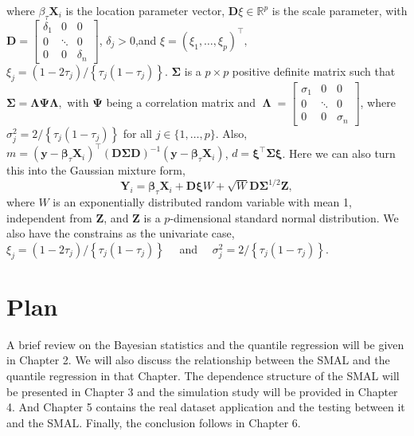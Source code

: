 \documentclass[mstat,12pt]{unswthesis}  %
\numberwithin{equation}{section}
\begin{document}
where $\beta_{\tau} \boldsymbol{X}_{i}$ is the location parameter vector, $\boldsymbol{D} {\xi} \in \mathbb{R}^{p}$ is the scale parameter, with ${\boldsymbol{D}}=\left[\begin{array}{ccc}\delta_{1} & 0 & 0 \\ 0 & \ddots & 0 \\ 0 & 0 & \delta_{n}\end{array}\right]$,
$\delta_{j}>0$,and ${\xi}=\left({\xi}_{1}, \ldots, {\xi}_{p}\right)^{\top},$ ${\xi}_{j}=\left(1-2 \tau_{j}\right) /\left\{\tau_{j}\left(1-\tau_{j}\right)\right\}$. 
${\boldsymbol{\Sigma}}$ is a $p \times p$ positive definite matrix such that ${\boldsymbol{\Sigma}}={\boldsymbol{\Lambda}} {\boldsymbol{\Psi}} {\boldsymbol{\Lambda}},$ with ${\boldsymbol{\Psi}}$ being a correlation matrix and
$\operatorname{{\boldsymbol{\Lambda}}} =\left[\begin{array}{ccc}\sigma_{1} & 0 & 0 \\ 0 & \ddots & 0 \\ 0 & 0 & \sigma_{n}\end{array}\right]$, where ${\sigma}_{j}^{2}=2 /\left\{\tau_{j}\left(1-\tau_{j}\right)\right\}$ for all $j \in\{1, \ldots, p\}$. Also, ${m}=\left(\boldsymbol{y}-\boldsymbol{\beta}_{\tau} \boldsymbol{X}_{i}\right)^{\top}(\boldsymbol{D} {\boldsymbol{\Sigma}} \boldsymbol{D})^{-1}\left(\boldsymbol{y}-\boldsymbol{\beta}_{\tau} \boldsymbol{X}_{i}\right)$, ${d}=\boldsymbol{{\xi}}^{\top} \boldsymbol{{\Sigma}} \boldsymbol{{\xi}}$. Here we can also turn this into the Gaussian mixture form,
\begin{equation}
    \boldsymbol{Y}_{i}=\boldsymbol{\beta}_{\tau} \boldsymbol{X}_{i}+\boldsymbol{D} \boldsymbol{{\xi}} W+\sqrt{W} \boldsymbol{D} \boldsymbol{{\Sigma}}^{1 / 2} \boldsymbol{Z},
\end{equation}
 where $W$ is an exponentially distributed random variable with mean 1, independent from $\boldsymbol{Z}$, and $\boldsymbol{Z}$ is a $p$-dimensional standard normal distribution. We also have the constrains as the univariate case, ${\xi}_{j}=\left(1-2 \tau_{j}\right) /\left\{\tau_{j}\left(1-\tau_{j}\right)\right\} \quad$ and $\quad {\sigma}_{j}^{2}=2 /\left\{\tau_{j}\left(1-\tau_{j}\right)\right\}$.
\section{Plan}
A brief review on the Bayesian statistics and the quantile regression will be given in Chapter 2. We will also discuss the relationship between the SMAL and the quantile regression in that Chapter. The dependence structure of the SMAL will be presented in Chapter 3 and the simulation study will be provided in Chapter 4. And Chapter 5 contains the real dataset application and the testing between it and the SMAL. Finally, the conclusion follows in Chapter 6.
\end{document}
